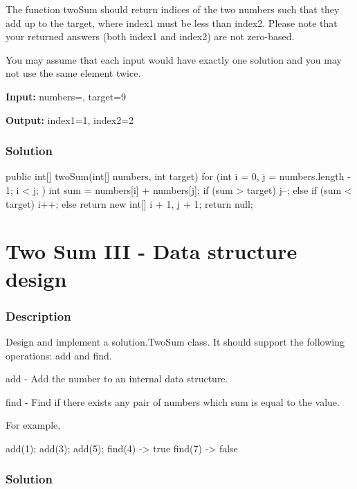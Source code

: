 The function twoSum should return indices of the two numbers such that they add up to the target, where index1 must be less than index2. Please note that your returned answers (both index1 and index2) are not zero-based.

You may assume that each input would have exactly one solution and you may not use the same element twice.

\textbf{Input:} numbers=, target=9

\textbf{Output:} index1=1, index2=2

\subsubsection{Solution}

\begin{Code}
public int[] twoSum(int[] numbers, int target) {
    for (int i = 0, j = numbers.length - 1; i < j; ) {
        int sum = numbers[i] + numbers[j];
        if (sum > target) {
            j--;
        } else if (sum < target) {
            i++;
        } else {
            return new int[] {i + 1, j + 1};
        }
    }
    return null;
}
\end{Code}

\newpage

\section{Two Sum III - Data structure design} %

\subsubsection{Description}
Design and implement a solution.TwoSum class. It should support the following operations: add and find.

add - Add the number to an internal data structure.

find - Find if there exists any pair of numbers which sum is equal to the value.

For example,
\begin{Code}
add(1); add(3); add(5);
find(4) -> true
find(7) -> false
\end{Code}

\subsubsection{Solution}

